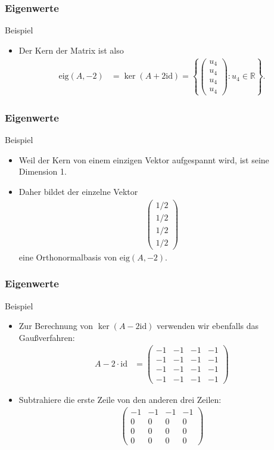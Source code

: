 \documentclass{beamer}
\newcommand\RR{\mathbb R}
\newcommand{\id}{\mathrm{id}}
\newcommand\cbc[1]{\left\{{#1}\right\}}
\newcommand{\eig}{\mathrm{eig}}
\newcommand{\mytitle}{Eigenwerte}
\begin{document}
\begin{frame}\frametitle{\mytitle}
	\begin{block}{Beispiel}
	\begin{itemize}
		\item Der Kern der Matrix ist also
			\begin{align*}
				\eig(A,-2)&=\ker(A+2\id)=\cbc{\begin{pmatrix} u_4\\u_4\\u_4\\u_4 \end{pmatrix}:u_4\in\RR}.
			\end{align*}
	\end{itemize}
	\end{block}
\end{frame}

\begin{frame}\frametitle{\mytitle}
	\begin{block}{Beispiel}
	\begin{itemize}
		\item Weil der Kern von einem einzigen Vektor aufgespannt wird, ist seine Dimension 1.
		\item Daher bildet der einzelne Vektor
			\begin{align*}
			\begin{pmatrix}
			1/2\\1/2\\1/2\\1/2
			\end{pmatrix}
			\end{align*}
			eine Orthonormalbasis von $\eig(A,-2)$.
	\end{itemize}
	\end{block}
\end{frame}

\begin{frame}\frametitle{\mytitle}
	\begin{block}{Beispiel}
	\begin{itemize}
		\item Zur Berechnung von $\ker(A-2\id)$ verwenden wir ebenfalls das Gau\ss verfahren:
			\begin{align*}
				A-2\cdot\id&= \begin{pmatrix} -1&-1&-1&-1\\-1&-1&-1&-1\\-1&-1&-1&-1\\-1&-1&-1&-1
				\end{pmatrix}
			\end{align*}
		\item Subtrahiere die erste Zeile von den anderen drei Zeilen:
\begin{align*}
	\begin{pmatrix}-1&-1&-1&-1\\0&0&0&0\\0&0&0&0\\0&0&0&0\end{pmatrix}
			\end{align*}
	\end{itemize}
	\end{block}
\end{frame}
\end{document}
